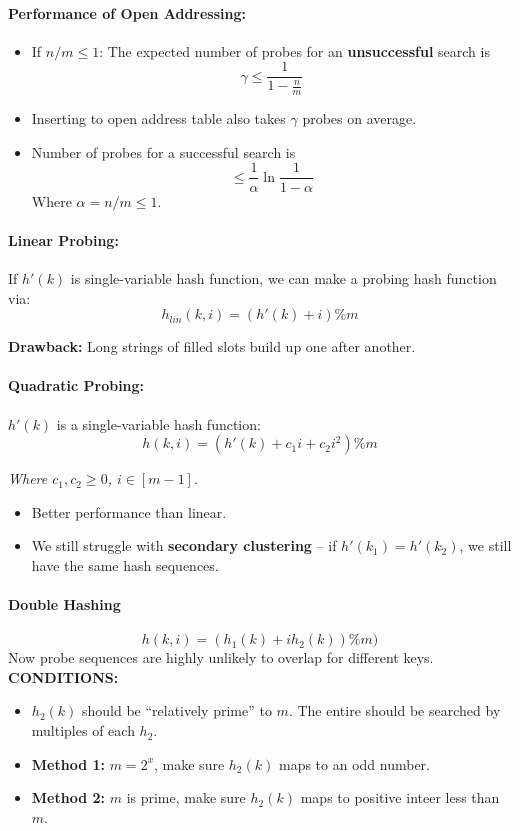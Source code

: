 \documentclass[a4paper,12pt]{report}
\begin{document}
\paragraph{Performance of Open Addressing: } 
\begin{itemize}
\item If $n/m \leq 1$: The expected number of probes for an \textbf{unsuccessful} search is $$\gamma \leq \frac{1}{1-\frac{n}{m}}$$
\item Inserting to open address table also takes $\gamma$ probes on average.
\item Number of probes for a successful search is $$\leq \frac{1}{\alpha} \ln \frac{1}{1-\alpha}$$
Where $\alpha = n/m \leq 1$.
\end{itemize}

\paragraph{Linear Probing: } If $h'(k)$ is single-variable hash function, we can make a probing hash function via: 
\begin{equation}
h_{lin}(k,i) = (h'(k) + i)\% m
\end{equation}

\textbf{Drawback:} Long strings of filled slots build up one after another.

\paragraph{Quadratic Probing: } $h'(k)$ is a single-variable hash function:
\begin{equation}
h(k,i) = (h'(k) + c_1 i + c_2 i^2)\% m
\end{equation}

\textit{Where $c_1, c_2 \geq 0$, $i\in [m-1]$}.
\begin{itemize}
\item Better performance than linear.
\item We still struggle with \textbf{secondary clustering} -- if $h'(k_1) = h'(k_2)$, we still have the same hash sequences.  
\end{itemize}


\paragraph{Double Hashing}

\begin{equation}
h(k,i) = (h_1(k) + ih_2(k)) \% m)
\end{equation}
Now probe sequences are highly unlikely to overlap for different keys. \textbf{CONDITIONS: } 
\begin{itemize}
\item $h_2(k)$ should be ``relatively prime'' to $m$. The entire should be searched by multiples of each $h_2$. 
\item \textbf{Method 1: } $m = 2^x$, make sure $h_2(k)$ maps to an odd number.
\item \textbf{Method 2: } $m$ is prime, make sure $h_2(k)$ maps to positive inteer less than $m$.
\end{itemize}
\end{document}

